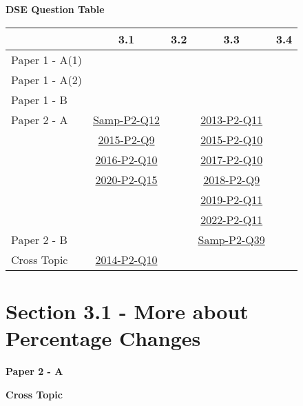 \documentclass[12pt, a4paper]{article}
\begin{document}
\begin{absolutelynopagebreak}
\begin{center}
\textbf{DSE Question Table}
\end{center}
\begin{center}
\begin{tabular}{|l|c|c|c|c|}
\hline
        & 3.1 & 3.2 & 3.3 & 3.4 \\\hline
\hline
Paper 1 - A(1)&  &  &  &  \\
\hline
Paper 1 - A(2)&  &  &  &  \\
\hline
Paper 1 - B&  &  &  &  \\
\hline
\hline
Paper 2 - A& \hyperref[DSE2012S-CoreP2-Q12]{Samp-P2-Q12} &  & \hyperref[DSE2013-CoreP2-Q11]{2013-P2-Q11} &  \\
& \hyperref[DSE2015-CoreP2-Q09]{2015-P2-Q9} &  & \hyperref[DSE2015-CoreP2-Q10]{2015-P2-Q10} &  \\
& \hyperref[DSE2016-CoreP2-Q10]{2016-P2-Q10} &  & \hyperref[DSE2017-CoreP2-Q10]{2017-P2-Q10} &  \\
& \hyperref[DSE2020-CoreP2-Q15]{2020-P2-Q15} &  & \hyperref[DSE2018-CoreP2-Q09]{2018-P2-Q9} &  \\
&  &  & \hyperref[DSE2019-CoreP2-Q11]{2019-P2-Q11} &  \\
&  &  & \hyperref[DSE2022-CoreP2-Q11]{2022-P2-Q11} &  \\
\hline
Paper 2 - B&  &  & \hyperref[DSE2012S-CoreP2-Q39]{Samp-P2-Q39} &  \\
\hline
\hline
Cross Topic& \hyperref[DSE2014-CoreP2-Q10]{2014-P2-Q10} &  &  &  \\
\hline
\end{tabular}
\end{center}
\end{absolutelynopagebreak}




\section*{Section 3.1 - More about Percentage Changes}\label{section:3-3-1}

\textbf{Paper 2 - A}
\begin{enumx}[label=\arabic*.,start=1]
\item {}\label{DSE2012S-CoreP2-Q12} 
\item {}\label{DSE2015-CoreP2-Q09} 
\item {}\label{DSE2016-CoreP2-Q10} 
\item {}\label{DSE2020-CoreP2-Q15} 
\end{enumx}
\textbf{Cross Topic}
\begin{enumx}[label=\arabic*.,start=5]
\item {}\label{DSE2014-CoreP2-Q10} 
\end{enumx}
\end{document}
